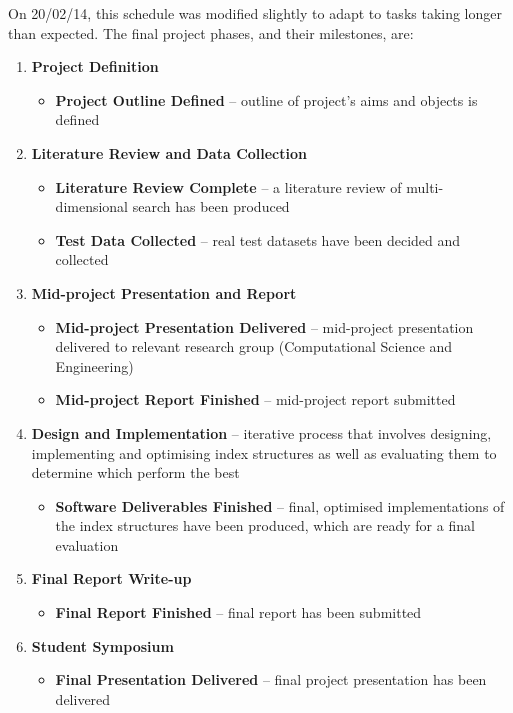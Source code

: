 On 20/02/14, this schedule was modified slightly to adapt to tasks taking longer than expected. The final project phases, and their milestones, are:
\begin{enumerate}
	\item \textbf{Project Definition}
	\begin{itemize}
		\item \textbf{Project Outline Defined} -- outline of project's aims and objects is defined 
	\end{itemize}
	\item \textbf{Literature Review and Data Collection}
	\begin{itemize}	
		\item \textbf{Literature Review Complete} -- a literature review of multi-dimensional search has been produced
		\item \textbf{Test Data Collected} -- real test datasets have been decided and collected
	\end{itemize}

	\vspace{60pt}

	\item \textbf{Mid-project Presentation and Report}
	\begin{itemize}	
		\item \textbf{Mid-project Presentation Delivered} -- mid-project presentation delivered to relevant research group (Computational Science and Engineering)
		\item \textbf{Mid-project Report Finished} --  mid-project report submitted
	\end{itemize}	
	\item \textbf{Design and Implementation} -- iterative process that involves designing, implementing and optimising index structures as well as evaluating them to determine which perform the best
	\begin{itemize}
		\item \textbf{Software Deliverables Finished} -- final, optimised implementations of the index structures have been produced, which are ready for a final evaluation
	\end{itemize}
	\item \textbf{Final Report Write-up}
	\begin{itemize}
		\item \textbf{Final Report Finished} -- final report has been submitted
	\end{itemize}
	\item \textbf{Student Symposium}
	\begin{itemize}
		\item \textbf{Final Presentation Delivered} -- final project presentation has been delivered 
	\end{itemize}
\end{enumerate}


